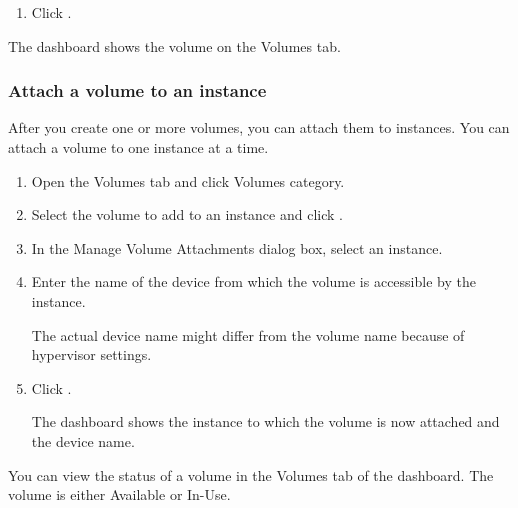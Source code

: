 \begin{enumerate}
\item Click .
\end{enumerate}

The dashboard shows the volume on the Volumes tab.

\subsubsection{Attach a volume to an
  instance}\label{attach-a-volume-to-an-instance}
After you create one or more volumes, you can attach them to
instances.  You can attach a volume to one instance at a time.

\begin{enumerate}
\item Open the Volumes tab and click Volumes
  category.
\item Select the volume to add to an instance and click .
\item In the Manage Volume Attachments dialog box, select an instance.
\item Enter the name of the device from which the volume is accessible
  by the instance.

   The actual device name might differ from the volume
  name because of hypervisor settings.
\item Click .

  The dashboard shows the instance to which the volume is now attached
  and the device name.
\end{enumerate}
You can view the status of a volume in the Volumes tab of the dashboard.
The volume is either Available or In-Use.

